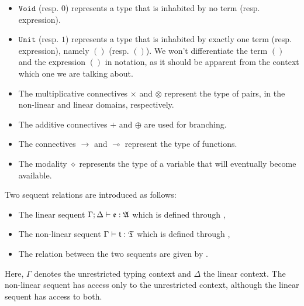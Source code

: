 \begin{itemize}
    \item $\mathtt{Void}$ (resp. $0$) represents a type that is inhabited by no term (resp. expression).
    \item $\mathtt{Unit}$ (resp. $1$) represents a type that is inhabited by exactly one term (resp. expression), namely $()$ (resp. $()$). We won't differentiate the term $()$ and the expression $()$ in notation, as it should be apparent from the context which one we are talking about.
    \item The multiplicative connectives $\times$ and $\otimes$ represent the type of pairs, in the non-linear and linear domains, respectively.
    \item The additive connectives $+$ and $\oplus$ are used for branching.
    \item The connectives $\rightarrow$ and $\multimap$ represent the type of functions.
    \item The modality $\diamond$ represents the type of a variable that will eventually become available.
\end{itemize}

\begin{definition}
Two sequent relations are introduced as follows:
\begin{itemize}
    \item The linear sequent $\Gamma; \Delta \vdash \mathfrak{e} : \mathfrak{A}$ which is defined through ,
    \item The non-linear sequent $\Gamma \vdash \mathfrak{t} : \mathfrak{T}$ which is defined through ,
    \item The relation between the two sequents are given by .
\end{itemize}
Here, $\Gamma$ denotes the unrestricted typing context and $\Delta$ the linear context. The non-linear sequent has access only to the unrestricted context, although the linear sequent has access to both.
\end{definition}